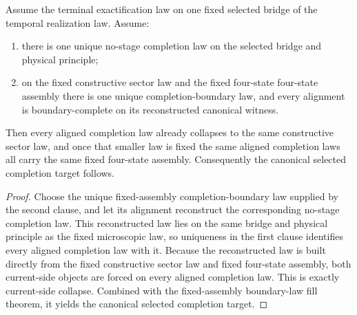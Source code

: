 \begin{theorem}
\label{thm:canonical-selected-completion-from-unique-completion-law-and-boundary-fill}
Assume the terminal exactification law on one fixed selected bridge of the
temporal realization law. Assume:
\begin{enumerate}
\item there is one unique no-stage completion law on the selected bridge and
physical principle;
\item on the fixed constructive sector law and the fixed four-state
four-state assembly there is one unique completion-boundary law, and every
alignment is boundary-complete on its reconstructed canonical
witness.
\end{enumerate}
Then every aligned completion law already collapses to the same constructive
sector law, and once that smaller law is fixed the same aligned completion laws
all carry the same fixed four-state assembly.
Consequently the canonical selected completion target follows.
\end{theorem}

\begin{proof}
Choose the unique fixed-assembly completion-boundary law supplied by the second
clause, and let its alignment reconstruct the corresponding no-stage
completion law. This reconstructed law lies on the same bridge and physical
principle as the fixed microscopic law, so uniqueness in the first clause
identifies every aligned completion law with it. Because the reconstructed law
is built directly from the fixed constructive sector law and fixed four-state
assembly, both current-side objects are forced on every aligned completion
law. This is exactly current-side collapse. Combined with the fixed-assembly
boundary-law fill theorem, it yields the canonical selected completion target.
\end{proof}


